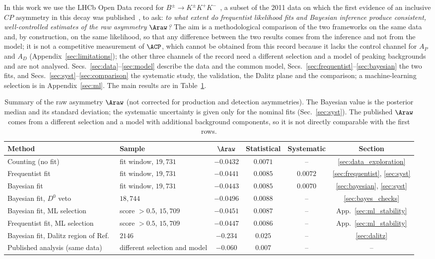 In this work we use the LHCb Open Data record for $B^{\pm}\to K^{\pm}K^{+}K^{-}$~\cite{opendata_record,opendata_notebook}, a subset of the 2011 data on which the first evidence of an inclusive $CP$ asymmetry in this decay was published~\cite{lhcb_cpv_2013}, to ask: \emph{to what extent do frequentist likelihood fits and Bayesian inference produce consistent, well-controlled estimates of the raw asymmetry $\Araw$?} The aim is a methodological comparison of the two frameworks on the same data and, by construction, on the same likelihood, so that any difference between the two results comes from the inference and not from the model; it is not a competitive measurement of $\ACP$, which cannot be obtained from this record because it lacks the control channel for $A_P$ and $A_D$ (Appendix~\ref{sec:limitations}); the other three channels of the record need a different selection and a model of peaking backgrounds and are not analysed. Secs.~\ref{sec:data}--\ref{sec:model} describe the data and the common model, Secs.~\ref{sec:frequentist}--\ref{sec:bayesian} the two fits, and Secs.~\ref{sec:syst}--\ref{sec:comparison} the systematic study, the validation, the Dalitz plane and the comparison; a machine-learning selection is in Appendix~\ref{sec:ml}. The main results are in Table~\ref{tab:summary}.

\begin{table}[t]
\centering
\begin{tabular}{llcccc}
\toprule
Method & Sample & $\Araw$ & Statistical & Systematic & Section \\
\midrule
Counting (no fit) & fit window, $19{,}731$ & $-0.0432$ & $0.0071$ & -- & \ref{sec:data_exploration} \\
Frequentist fit & fit window, $19{,}731$ & $-0.0441$ & $0.0085$ & $0.0072$ & \ref{sec:frequentist}, \ref{sec:syst} \\
Bayesian fit & fit window, $19{,}731$ & $-0.0443$ & $0.0085$ & $0.0070$ & \ref{sec:bayesian}, \ref{sec:syst} \\
Bayesian fit, $D^0$ veto & $18{,}744$ & $-0.0496$ & $0.0088$ & -- & \ref{sec:bayes_checks} \\
Bayesian fit, ML selection & score $>0.5$, $15{,}709$ & $-0.0451$ & $0.0087$ & -- & App.~\ref{sec:ml_stability} \\
Frequentist fit, ML selection & score $>0.5$, $15{,}709$ & $-0.0447$ & $0.0086$ & -- & App.~\ref{sec:ml_stability} \\
Bayesian fit, Dalitz region of Ref.~\cite{lhcb_cpv_2013} & $2146$ & $-0.234$ & $0.025$ & -- & \ref{sec:dalitz} \\
\midrule
Published analysis (same data)~\cite{lhcb_cpv_2013} & different selection and model & $-0.060$ & $0.007$ & -- & -- \\
\bottomrule
\end{tabular}
\caption{Summary of the raw asymmetry $\Araw$ (not corrected for production and detection asymmetries). The Bayesian value is the posterior median and its standard deviation; the systematic uncertainty is given only for the nominal fits (Sec.~\ref{sec:syst}). The published $\Araw$ comes from a different selection and a model with additional background components, so it is not directly comparable with the first rows.}
\label{tab:summary}
\end{table}
